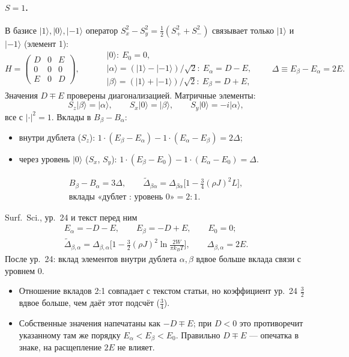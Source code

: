 \paragraph{$S=1$.} В базисе $|1\rangle,|0\rangle,|{-1}\rangle$ оператор
$S_x^2-S_y^2=\tfrac12(S_+^2+S_-^2)$ связывает только $|1\rangle$ и $|{-1}\rangle$ (элемент 1):
\[
H=\begin{pmatrix}D&0&E\\0&0&0\\E&0&D\end{pmatrix},\qquad
\begin{aligned}
&|0\rangle:\ E_0=0,\\
&|\alpha\rangle=(|1\rangle-|{-1}\rangle)/\sqrt2:\ E_\alpha=D-E,\\
&|\beta\rangle=(|1\rangle+|{-1}\rangle)/\sqrt2:\ E_\beta=D+E,
\end{aligned}
\qquad \Delta\equiv E_\beta-E_\alpha=2E .
\]
Значения $D\mp E$ проверены диагонализацией. Матричные элементы:
\[
S_z|\beta\rangle=|\alpha\rangle,\qquad S_x|0\rangle=|\beta\rangle,\qquad S_y|0\rangle=-i|\alpha\rangle,
\]
все с $|\cdot|^2=1$. Вклады в $B_\beta-B_\alpha$:
\begin{itemize}
\item внутри дублета ($S_z$):
  $1\cdot(E_\beta-E_\alpha)-1\cdot(E_\alpha-E_\beta)=2\Delta$;
\item через уровень $|0\rangle$ ($S_x$, $S_y$):
  $1\cdot(E_\beta-E_0)-1\cdot(E_\alpha-E_0)=\Delta$.
\end{itemize}
\begin{resbox}[Сдвиг расщепления $S=1$, нормировка Surf.\ Sci.]
\begin{gather*}
B_\beta-B_\alpha=3\Delta,\qquad \tilde\Delta_{\beta\alpha}=\Delta_{\beta\alpha}\Big[1-\tfrac34(\rho J)^2L\Big],\\
\text{вклады «дублет : уровень 0»}=2:1 .
\end{gather*}
\end{resbox}
\begin{paperbox}{Surf.\ Sci., ур.~24 и текст перед ним}
\begin{gather*}
E_\alpha=-D-E,\qquad E_\beta=-D+E,\qquad E_0=0;\\
\tilde\Delta_{\beta,\alpha}=\Delta_{\beta,\alpha}\Big[1-\frac32(\rho J)^2\ln\frac{2W}{\pi k_BT}\Big],
\qquad \Delta_{\beta,\alpha}=2E .
\end{gather*}
После ур.~24: вклад элементов внутри дублета $\alpha,\beta$ вдвое больше вклада
связи с уровнем 0.
\end{paperbox}
\begin{cmpbox}
\begin{itemize}
\item Отношение вкладов 2:1 совпадает с текстом статьи, но коэффициент
  ур.~24 $\tfrac32$ вдвое больше, чем даёт этот подсчёт ($\tfrac34$).
\item Собственные значения напечатаны как $-D\mp E$; при $D<0$ это противоречит
  указанному там же порядку $E_\alpha<E_\beta<E_0$. Правильно $D\mp E$ --- опечатка в знаке,
  на расщепление $2E$ не влияет.
\end{itemize}
\end{cmpbox}

